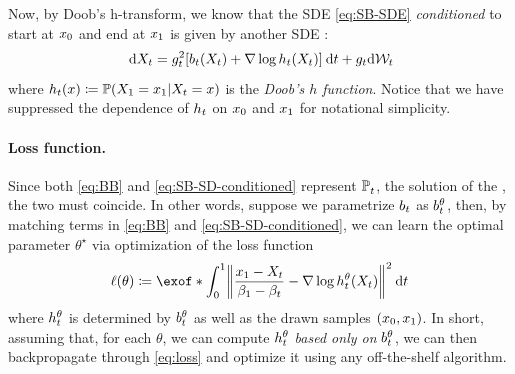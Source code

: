 Now, by Doob's h-transform, we know that the \acrshort{SDE} \eqref{eq:SB-SDE} \emph{conditioned} to start at $x_0$ and end at $x_1$ is given by another \acrshort{SDE}  \citep{doob1984classical,rogers2000diffusions}:
\begin{equation}
\label{eq:SB-SD-conditioned}
\dd X_t = \volatsq[\ctime]\bracks*{\fdrift(X_t) + \nabla \log \doob(X_t) }\dt +\volat \mathrm{d}\gW_t
\end{equation}
where $h_t(x) \coloneqq \operatorname{\mathbb{P}}(X_1 = x_1\vert X_t = x)$ is the \emph{Doob's $h$ function}. Notice that we have suppressed the dependence of $h_t$ on $x_0$ and $x_1$ for notational simplicity. %

\paragraph{Loss function.}

Since both \eqref{eq:BB} and \eqref{eq:SB-SD-conditioned} represent $\mathbb{P}^{}_{ t }$, the solution of the , the two  must coincide. 
In other words, suppose we parametrize $b_t$ as $b_t^\theta$, then, by matching terms in \eqref{eq:BB} and \eqref{eq:SB-SD-conditioned}, we can learn the optimal parameter $\theta^\star$ via optimization of the loss function
\begin{equation}
\label{eq:loss}
\Loss(\theta) \defeq \exof*{\int_0^1 \norm*{ \frac{\x_1-X_t}{\cvolat[\horizon]-\cvolat[\ctime]}-\nabla \log \doob^\theta(X_t)}^2 \dt  }
\end{equation}where $h_t^\theta$ is determined by $b_t^\theta$ as well as the drawn samples $(x_0,x_1)$. In short, assuming that, for each $\theta$, we can compute $h_t^\theta$ \emph{based only on} $b_t^\theta$, we can then backpropagate through \eqref{eq:loss} and optimize it using any off-the-shelf algorithm.

